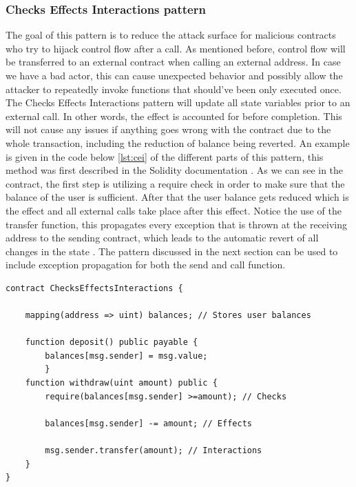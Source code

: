 \documentclass[sigconf]{acmart}
\begin{document}
\subsubsection{Checks Effects Interactions pattern}
The goal of this pattern is to reduce the attack surface for malicious contracts who try to hijack control flow after a call. 
As mentioned before, control flow will be transferred to an external contract when calling an external address. In case we have a bad actor, this can cause unexpected behavior and possibly allow the attacker to repeatedly invoke functions that should've been only executed once. The Checks Effects Interactions pattern will update all state variables prior to an external call.\cite{cei} In other words, the effect is accounted for before completion. This will not cause any issues if anything goes wrong with the contract due to the whole transaction, including the reduction of balance being reverted. An example is given in the code below \ref{lst:cei} of the different parts of this pattern, this method was first described in the Solidity documentation \cite{solidity}. As we can see in the contract, the first step is utilizing a require check in order to make sure that the balance of the user is sufficient. After that the user balance gets reduced which is the effect and all external calls take place after this effect. Notice the use of the transfer function, this propagates every exception that is thrown at the receiving address to the sending contract, which leads to the automatic revert of all changes in the state . The pattern discussed in the next section can be used to include exception propagation for both the send and call function.

\begin{lstlisting}[language=Solidity, caption=Checks Effects Interactions pattern, label={lst:cei}]
contract ChecksEffectsInteractions {
    
    mapping(address => uint) balances; // Stores user balances
    
    function deposit() public payable {
        balances[msg.sender] = msg.value;
        }
    function withdraw(uint amount) public {
        require(balances[msg.sender] >=amount); // Checks
        
        balances[msg.sender] -= amount; // Effects
        
        msg.sender.transfer(amount); // Interactions
    }
}

\end{lstlisting}
\end{document}

